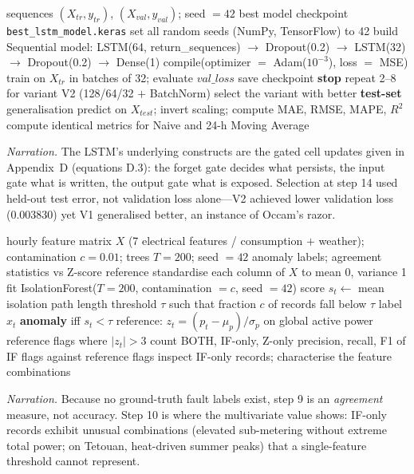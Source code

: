 \documentclass[11pt,a4paper]{article}
\begin{document}
\begin{algorithm}[H]
\caption*{\textbf{Algorithm A.2} --- LSTM demand forecaster: training and selection}
\begin{algorithmic}[1]
\Require sequences $(X_{tr},y_{tr})$, $(X_{val},y_{val})$; seed $=42$
\Ensure best model checkpoint \texttt{best\_lstm\_model.keras}
\State set all random seeds (NumPy, TensorFlow) to 42
\State build Sequential model: LSTM(64, return\_sequences) $\to$ Dropout(0.2)
       $\to$ LSTM(32) $\to$ Dropout(0.2) $\to$ Dense(1) 
\State compile(optimizer $=$ Adam($10^{-3}$), loss $=$ MSE)
  \State train on $X_{tr}$ in batches of 32; evaluate $val\_loss$
   \State save checkpoint \EndIf
   \State \textbf{stop}  \EndIf
\EndFor
\State repeat 2--8 for variant V2 (128/64/32 $+$ BatchNorm)
\State select the variant with better \textbf{test-set} generalisation 
\State predict on $X_{test}$; invert scaling; compute MAE, RMSE, MAPE, $R^2$
\State compute identical metrics for Naive and 24-h Moving Average
\end{algorithmic}
\end{algorithm}
\noindent\textit{Narration.} The LSTM's underlying constructs are the gated
cell updates given in Appendix~D (equations D.3): the forget gate decides what
persists, the input gate what is written, the output gate what is exposed.
Selection at step 14 used held-out test error, not validation loss alone---V2
achieved lower validation loss (0.003830) yet V1 generalised better, an
instance of Occam's razor.

\begin{algorithm}[H]
\caption*{\textbf{Algorithm A.3} --- Multivariate anomaly detection and agreement study}
\begin{algorithmic}[1]
\Require hourly feature matrix $X$ (7 electrical features / consumption $+$
weather); contamination $c = 0.01$; trees $T = 200$; seed $= 42$
\Ensure anomaly labels; agreement statistics vs Z-score reference
\State standardise each column of $X$ to mean 0, variance 1
\State fit IsolationForest($T{=}200$, contamination $=c$, seed $=42$)
 \State score $s_t \gets$ mean isolation path length \EndFor
\State threshold $\tau$ such that fraction $c$ of records fall below $\tau$
\State label $x_t$ \textbf{anomaly} iff $s_t < \tau$ 
\State reference: $z_t = (p_t - \mu_p)/\sigma_p$ on global active power
\State reference flags where $|z_t| > 3$ 
\State count BOTH, IF-only, Z-only 
\State precision, recall, F1 of IF flags against reference flags
\State inspect IF-only records; characterise the feature combinations
\end{algorithmic}
\end{algorithm}
\noindent\textit{Narration.} Because no ground-truth fault labels exist, step 9
is an \emph{agreement} measure, not accuracy. Step 10 is where the multivariate
value shows: IF-only records exhibit unusual combinations (elevated sub-metering
without extreme total power; on Tetouan, heat-driven summer peaks) that a
single-feature threshold cannot represent.
\end{document}
